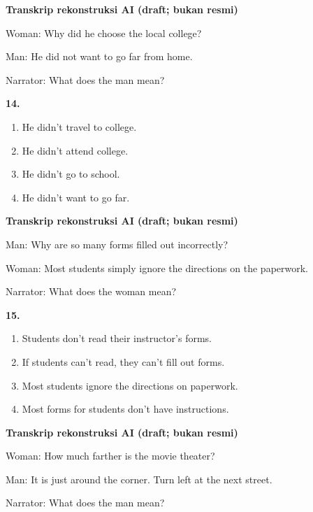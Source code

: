 \documentclass[12pt]{article}
\begin{document}
\par
\vspace{0.25\baselineskip}
\begin{exampleblock}
\textbf{Transkrip rekonstruksi AI (draft; bukan resmi)}\par
Woman: Why did he choose the local college?\par
Man: He did not want to go far from home.\par
Narrator: What does the man mean?\par
\end{exampleblock}
\noindent\textbf{14.}
\begin{enumerate}[label=(\Alph*),leftmargin=*,itemsep=0.2em]
\item He didn't travel to college.
\item He didn't attend college.
\item He didn't go to school.
\item He didn't want to go far.
\end{enumerate}
\par
\vspace{0.25\baselineskip}
\begin{exampleblock}
\textbf{Transkrip rekonstruksi AI (draft; bukan resmi)}\par
Man: Why are so many forms filled out incorrectly?\par
Woman: Most students simply ignore the directions on the paperwork.\par
Narrator: What does the woman mean?\par
\end{exampleblock}
\noindent\textbf{15.}
\begin{enumerate}[label=(\Alph*),leftmargin=*,itemsep=0.2em]
\item Students don't read their instructor's forms.
\item If students can't read, they can't fill out forms.
\item Most students ignore the directions on paperwork.
\item Most forms for students don't have instructions.
\end{enumerate}
\par
\vspace{0.25\baselineskip}
\begin{exampleblock}
\textbf{Transkrip rekonstruksi AI (draft; bukan resmi)}\par
Woman: How much farther is the movie theater?\par
Man: It is just around the corner. Turn left at the next street.\par
Narrator: What does the man mean?\par
\end{exampleblock}
\end{document}
